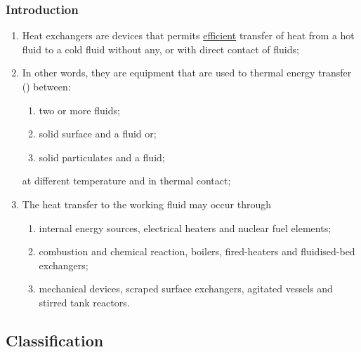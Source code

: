 \documentclass[10pt,compress,handout,ignorenonframetext,unknownkeysallowed]{beamer}
\begin{document}
\begin{frame}
 \frametitle{Introduction}
    \begin{enumerate}%
        \item<1-> Heat exchangers are devices that permits \underline{efficient} transfer of heat from a hot fluid to a cold fluid without any, or with direct contact of fluids;
        \item<2-> In other words, they are equipment that are used to thermal energy transfer (\ie {}) between:
            \begin{enumerate}%
               \item<2-> two or more fluids;
               \item<2-> solid surface and a fluid or;
               \item<2-> solid particulates and a fluid;
            \end{enumerate}
            at different temperature and in thermal contact;
       \item<3-> The heat transfer to the working fluid may occur through
            \begin{enumerate}%
               \item<3-> internal energy sources, \eg electrical heaters and nuclear fuel elements;
               \item<3-> combustion and chemical reaction, \eg boilers, fired-heaters and fluidised-bed exchangers;
               \item<3-> mechanical devices, \eg scraped surface exchangers, agitated vessels and stirred tank reactors.
            \end{enumerate}
   \end{enumerate}
\end{frame}


\subsection{Classification}
\end{document}
